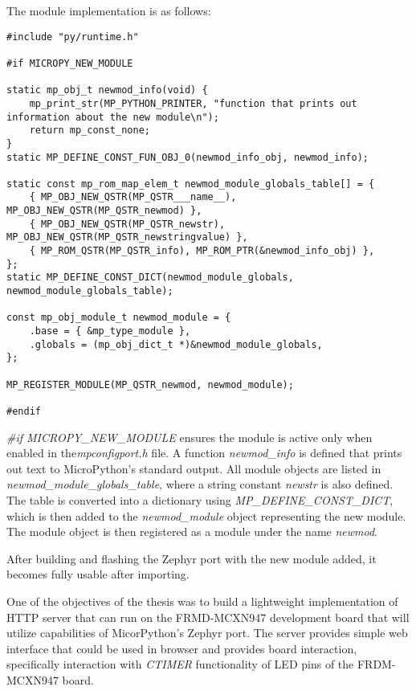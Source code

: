 \documentclass[twoside, 12pt]{article}
\begin{document}
The module implementation is as follows:
\begin{lstlisting}[caption={Implementing a new module for the Zephyr port, Part 3},breaklines=true]
#include "py/runtime.h"

#if MICROPY_NEW_MODULE

static mp_obj_t newmod_info(void) {
    mp_print_str(MP_PYTHON_PRINTER, "function that prints out information about the new module\n");
    return mp_const_none;
}
static MP_DEFINE_CONST_FUN_OBJ_0(newmod_info_obj, newmod_info);

static const mp_rom_map_elem_t newmod_module_globals_table[] = {
    { MP_OBJ_NEW_QSTR(MP_QSTR___name__), MP_OBJ_NEW_QSTR(MP_QSTR_newmod) },
    { MP_OBJ_NEW_QSTR(MP_QSTR_newstr), MP_OBJ_NEW_QSTR(MP_QSTR_newstringvalue) },
    { MP_ROM_QSTR(MP_QSTR_info), MP_ROM_PTR(&newmod_info_obj) },
};
static MP_DEFINE_CONST_DICT(newmod_module_globals, newmod_module_globals_table);

const mp_obj_module_t newmod_module = {
    .base = { &mp_type_module },
    .globals = (mp_obj_dict_t *)&newmod_module_globals,
};

MP_REGISTER_MODULE(MP_QSTR_newmod, newmod_module);

#endif
\end{lstlisting}

\textit{\#if MICROPY\_NEW\_MODULE} ensures the module is active only when enabled in 
the\textit{mpconfigport.h} file. A function \textit{newmod\_info} is defined that prints out
text to MicroPython's standard output. All module objects are listed in 
\textit{newmod\_module\_globals\_table}, where a string constant 
\textit{newstr} is also defined. The table is converted into a dictionary using 
\textit{MP\_DEFINE\_CONST\_DICT}, which is then added to the \textit{newmod\_module} object 
representing the new module. The module object is then registered as a module under the name 
\textit{newmod}.\cite{mpy_new_module}

After building and flashing the Zephyr port with the new module added, it becomes fully usable after importing.

One of the objectives of the thesis was to build a lightweight implementation of HTTP server 
that can run on the FRMD-MCXN947 development board that will utilize capabilities of 
MicorPython's Zephyr port. The server provides simple web interface that could be used in 
browser and provides board interaction, specifically interaction with \textit{CTIMER} 
functionality of LED pins of the FRDM-MCXN947 board.
\end{document}
